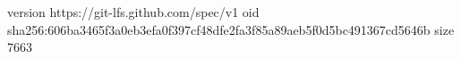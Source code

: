 version https://git-lfs.github.com/spec/v1
oid sha256:606ba3465f3a0eb3efa0f397cf48dfe2fa3f85a89aeb5f0d5bc491367cd5646b
size 7663
